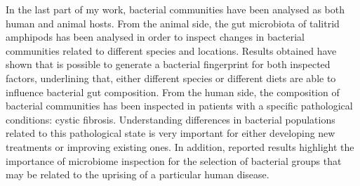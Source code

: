 In the last part of my work, bacterial communities have been analysed as both human and animal hosts. From the animal side, the gut microbiota of talitrid amphipods has been analysed in order to inspect changes in bacterial communities related to different species and locations. Results obtained have shown that is possible to generate a bacterial fingerprint for both inspected factors, underlining that, either different species or different diets are able to influence bacterial gut composition. From the human side, the composition of bacterial communities has been inspected in patients with a specific pathological conditions: cystic fibrosis. Understanding differences in bacterial populations related to this pathological state is very important for either developing new treatments or improving existing ones. In addition, reported results highlight the importance of microbiome inspection for the selection of bacterial groups that may be related to the uprising of a particular human disease.\\